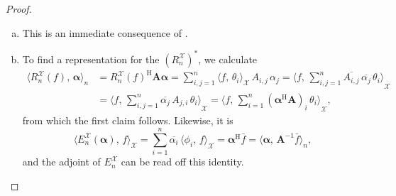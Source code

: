 \documentclass[a4paper]{paper}
\newcommand{\Spc}[1]{\mathscr{#1}}
\newcommand*{\EXT}[2]{\ensuremath{E_{#1}^{#2}}}
\newcommand*{\REST}[2]{\ensuremath{R_{#1}^{#2}}}
\newcommand*{\RnX}{\ensuremath{\REST{n}{\Spc{X}}}}
\newcommand*{\EnX}{\ensuremath{\EXT{n}{\Spc{X}}}}
\newcommand*{\INNER}[2]{\ensuremath{\langle #1,\,#2\rangle}}
\newcommand*{\INNERbig}[2]{\ensuremath{\big\langle #1,\,#2\big\rangle}}
\newcommand*{\INNERbigg}[2]{\ensuremath{\bigg\langle #1,\,#2\bigg\rangle}}
\newcommand*{\HERM}[1]{{\ensuremath{#1^{\mathrm{H}}}}}
\newcommand{\valpha}{\boldsymbol{\alpha}}
\newcommand{\vA}{\boldsymbol{A}}
\begin{document}
\begin{proof}~
 \begin{enumerate}[(a)]
  \item This is an immediate consequence of .
 
  \item To find a representation for the $(\RnX)^*$, we calculate
  \begin{align*}
   \INNERbig{\RnX(f)}{\valpha}_n 
   &= \HERM{\RnX(f)} \vA \valpha = \sum_{i,j=1}^n \INNER{f}{\theta_i}_{\Spc{X}}\, A_{i,j}\, \alpha_j
   = \INNERbigg{f}{\sum_{i,j=1}^n \overline{A_{i,j}}\, \overline{\alpha_j}\, \theta_i}_{\Spc{X}} \\
   &= \INNERbigg{f}{\sum_{i,j=1}^n \overline{\alpha_j}\, A_{j,i}\, \theta_i}_{\Spc{X}} 
   = \INNERbigg{f}{\sum_{i=1}^n (\HERM{\valpha} \vA)_i\, \theta_i}_{\Spc{X}},
  \end{align*}
  from which the first claim follows. Likewise, it is
  \begin{equation*}
   \INNERbig{\EnX(\valpha)}{f}_{\Spc{X}}
   = \sum_{i=1}^n \overline{\alpha_i}\, \INNER{\phi_i}{f}_{\Spc{X}}
   = \HERM{\valpha} \bar f
   = \INNERbig{\valpha}{\vA^{-1} \bar f}_n,
  \end{equation*}
  and the adjoint of $\EnX$ can be read off this identity.


\end{enumerate}
\end{proof}
\end{document}
